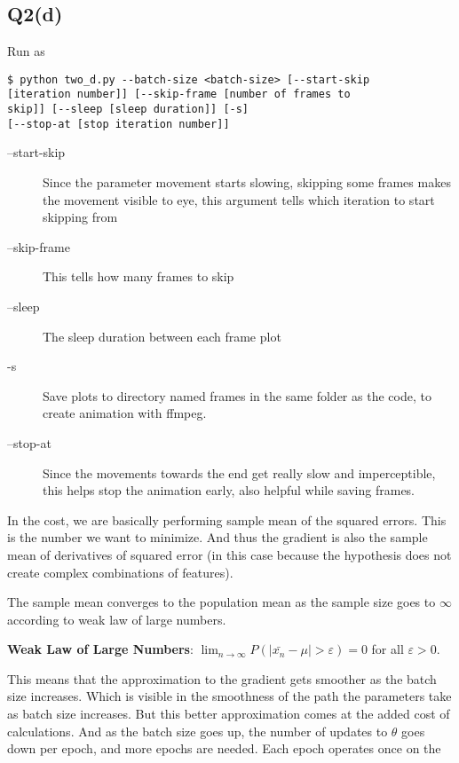 \documentclass[11pt]{article}
\begin{document}
\subsection{Q2(d)}
\begin{codebox}
Run as
\begin{verbatim}
$ python two_d.py --batch-size <batch-size> [--start-skip
[iteration number]] [--skip-frame [number of frames to
skip]] [--sleep [sleep duration]] [-s]
[--stop-at [stop iteration number]]
\end{verbatim}
\begin{description}
	\item[--start-skip] Since the parameter
		movement starts slowing, skipping some
		frames makes the movement visible to eye,
		this argument tells which iteration to start
		skipping from
	\item[--skip-frame] This tells how many
		frames to skip
	\item[--sleep] The sleep duration between
		each frame plot
	\item[-s] Save plots to directory named
		frames in the same folder as the
		code, to create animation with ffmpeg.
	\item[--stop-at] Since the movements towards
		the end get really slow and imperceptible,
		this helps stop the animation early, also
		helpful while saving frames.
\end{description}
\end{codebox}
\label{sec:orgcee7e86}
In the cost, we are basically performing sample mean of the squared
errors. This is the number we want to minimize. And thus the gradient
is also the sample mean of derivatives of squared error (in this case
because the hypothesis does not create complex combinations of
features).\par
The sample mean converges to the population mean as the sample size
goes to \(\infty\) according to weak law of large numbers.\par
\textbf{Weak Law of Large Numbers}:
\(\displaystyle\lim_{n\rightarrow\infty}P(\lvert\bar{x_n}-\mu\rvert>\varepsilon)=0\)
for all \(\varepsilon > 0\).\par
This means that the approximation to the gradient gets smoother as the
batch size increases. Which is visible in the smoothness of the path
the parameters take as batch size increases. But this
better approximation comes at the added cost of calculations. And as
the batch size goes up, the number of updates to \(\theta\) goes down
per epoch, and more epochs are needed. Each epoch operates once on the
\end{document}
